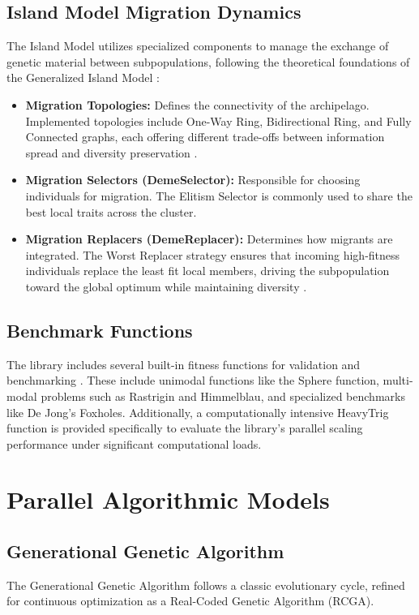 \documentclass[conference]{IEEEtran}
\begin{document}
    \subsection{Island Model Migration Dynamics}
    The Island Model utilizes specialized components to manage the exchange of genetic material between subpopulations, following the theoretical foundations of the Generalized Island Model \cite{b4}:
    \begin{itemize}
        \item \textbf{Migration Topologies:} Defines the connectivity of the archipelago. Implemented topologies include One-Way Ring, Bidirectional Ring, and Fully Connected graphs, each offering different trade-offs between information spread and diversity preservation \cite{b6}.
        \item \textbf{Migration Selectors (DemeSelector):} Responsible for choosing individuals for migration. The Elitism Selector is commonly used to share the best local traits across the cluster.
        \item \textbf{Migration Replacers (DemeReplacer):} Determines how migrants are integrated. The Worst Replacer strategy ensures that incoming high-fitness individuals replace the least fit local members, driving the subpopulation toward the global optimum while maintaining diversity \cite{b5}.
    \end{itemize}

    \subsection{Benchmark Functions}
    The library includes several built-in fitness functions for validation and benchmarking \cite{b6}. These include unimodal functions like the Sphere function, multi-modal problems such as Rastrigin and Himmelblau, and specialized benchmarks like De Jong's Foxholes. Additionally, a computationally intensive HeavyTrig function is provided specifically to evaluate the library's parallel scaling performance under significant computational loads.

    \section{Parallel Algorithmic Models}
    
    \subsection{Generational Genetic Algorithm}
    The Generational Genetic Algorithm follows a classic evolutionary cycle, refined for continuous optimization as a Real-Coded Genetic Algorithm (RCGA).
\end{document}
